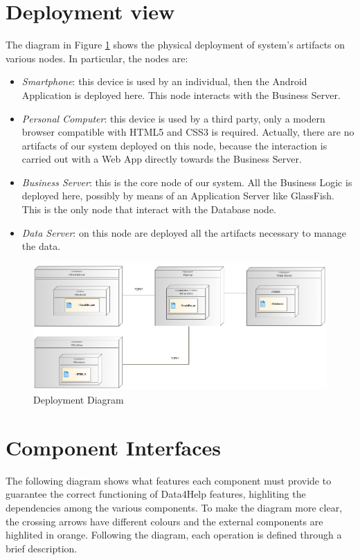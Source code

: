 \section{Deployment view}



The diagram in Figure \ref{f:depl_diag} shows the physical deployment of system's artifacts on various nodes.
In particular, the nodes are:

\begin{itemize}
\item \textit{Smartphone}: this device is used by an individual, then the Android Application is deployed here. This node interacts with the Business Server.
\item \textit{Personal Computer}: this device is used by a third party, only a modern browser compatible with HTML5 and CSS3 is required. Actually, there are no artifacts of our system deployed on this node, because the interaction is carried out with a Web App directly towards the Business Server.
\item \textit{Business Server}: this is the core node of our system.
All the Business Logic is deployed here, possibly by means of an Application Server like GlassFish.
This is the only node that interact with the Database node.
\item \textit{Data Server}: on this node are deployed all the artifacts necessary to manage the data.
\end{itemize}


\begin{figure}[h]
\centering
\includegraphics[width=\linewidth]{resources/uml/depldiag}
\caption{Deployment Diagram}\label{f:depl_diag}
\end{figure}

\section{Component Interfaces}
The following diagram shows what features each component must provide to guarantee the correct functioning of Data4Help features, highliting the dependencies among the various components.
To make the diagram more clear, the crossing arrows have different colours and the external components are highlited in orange.
Following the diagram, each operation is defined through a brief description.

